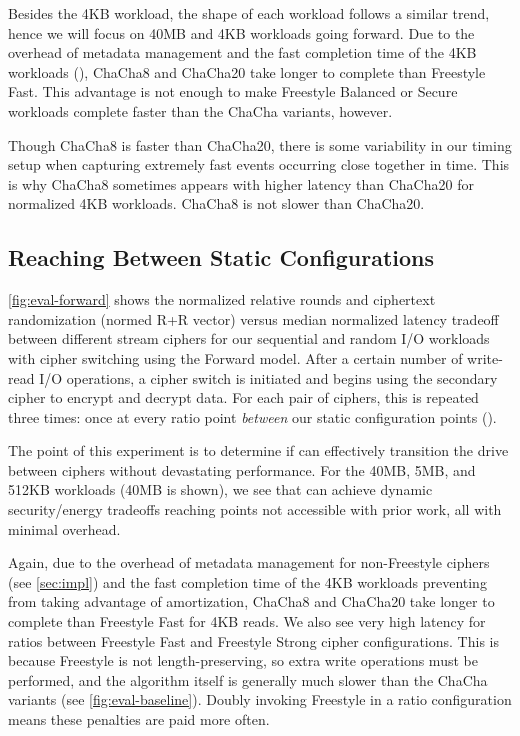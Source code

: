 Besides the 4KB workload, the shape of each workload follows a similar trend,
hence we will focus on 40MB and 4KB workloads going forward. Due to the overhead
of metadata management and the fast completion time of the 4KB workloads
(), ChaCha8 and ChaCha20 take
longer to complete than Freestyle Fast. This advantage is not enough to make
Freestyle Balanced or Secure workloads complete faster than the ChaCha variants,
however.

Though ChaCha8 is faster than ChaCha20, there is some variability in our timing
setup when capturing extremely fast events occurring close together in time.
This is why ChaCha8 sometimes appears with higher latency than ChaCha20 for
normalized 4KB workloads. ChaCha8 is not slower than ChaCha20.


\subsection{Reaching Between Static Configurations}\label{subsec:eval-dynamic}



\cref{fig:eval-forward} shows the normalized relative rounds and ciphertext
randomization (normed R+R vector) versus median normalized latency tradeoff
between different stream ciphers for our sequential and random I/O workloads
with cipher switching using the Forward model. After a certain number of
write-read I/O operations, a cipher switch is initiated and \sys begins using
the secondary cipher to encrypt and decrypt data. For each pair of ciphers, this
is repeated three times: once at every ratio point {\em between} our static
configuration points ().

The point of this experiment is to determine if \sys can effectively transition
the drive between ciphers without devastating performance. For the 40MB, 5MB,
and 512KB workloads (40MB is shown), we see that \sys can achieve dynamic
security/energy tradeoffs reaching points not accessible with prior work, all
with minimal overhead.

Again, due to the overhead of metadata management for non-Freestyle ciphers (see
\cref{sec:impl}) and the fast completion time of the 4KB workloads preventing
\sys from taking advantage of amortization, ChaCha8 and ChaCha20 take longer to
complete than Freestyle Fast for 4KB reads. We also see very high latency for
ratios between Freestyle Fast and Freestyle Strong cipher configurations. This
is because Freestyle is not length-preserving, so extra write operations must be
performed, and the algorithm itself is generally much slower than the ChaCha
variants (see \cref{fig:eval-baseline}). Doubly invoking Freestyle in a ratio
configuration means these penalties are paid more often.


